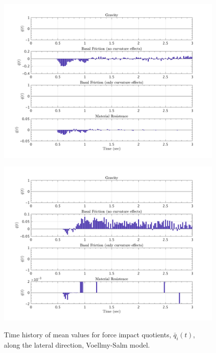 \documentclass{article}
\begin{document}
\begin{figure}[H]
        \begin{minipage}[b]{0.5\linewidth}
                \centering
                \includegraphics[width=1\textwidth]{InclinedPlane/LocalRecords/ContribF15_V_y.png}
                \label{fig:Ramp-Vy3}
        \end{minipage}
        \begin{minipage}[b]{0.5\linewidth}
                \centering
                \includegraphics[width=1\textwidth]{InclinedPlane/LocalRecords/ContribF17_V_y.png}
                \label{fig:Ramp-Vy4}
        \end{minipage}
        \caption{Time history of mean values for force impact quotients, $\bar{q}_i(t)$, along the lateral direction, Voellmy-Salm model.}
        \label{fig:Ramp-Vy}
\end{figure}
\end{document}
